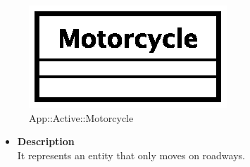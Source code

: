 \begin{figure}[h]
\centering
\includegraphics[scale=0.6,keepaspectratio]{images/solution/motorcycle.eps}
\caption{App::Active::Motorcycle}
\label{fig:sd-app-motorcycle}
\end{figure}
\FloatBarrier
\begin{itemize}
  \item \textbf{Description} \\
It represents an entity that only moves on roadways.
\end{itemize} 

